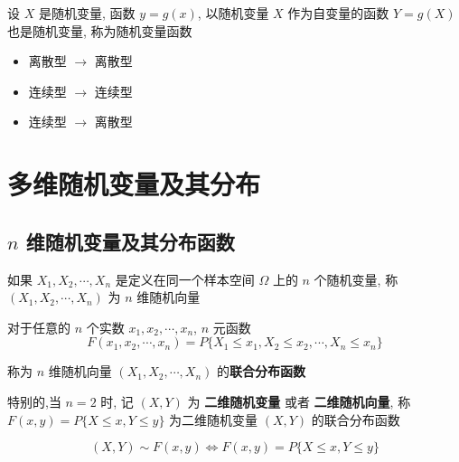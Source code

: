 \begin{definition}
	设 $X$ 是随机变量, 函数 $y = g(x)$, 以随机变量 $X$ 作为自变量的函数 $Y = g(X)$ 也是随机变量, 称为随机变量函数
	\begin{itemize}
		\item 离散型 $\to$ 离散型
		\item 连续型 $\to$ 连续型
		\item 连续型 $\to$ 离散型
	\end{itemize}
\end{definition}


\chapter{多维随机变量及其分布}

\section{$n$ 维随机变量及其分布函数}

\begin{definition}[$n$维随机变量]
	如果 $X_{1}, X_{2}, \cdots, X_{n}$ 是定义在同一个样本空间 $\Omega$ 上的 $n$ 个随机变量, 称 $(X_{1}, X_{2}, \cdots, X_{n})$ 为 $n$ 维随机向量
\end{definition}

\begin{definition}[$n$维随机变量分布函数]

	对于任意的 $n$ 个实数 $x_{1}, x_{2}, \cdots, x_{n}$, $n$ 元函数
	$$F(x_{1}, x_{2}, \cdots, x_{n}) = P\{X_{1}\leq x_{1},X_{2}\leq x_{2},\cdots,X_{n}\leq x_{n}\}$$
	
	称为 $n$ 维随机向量 $(X_{1},X_{2},\cdots,X_{n})$ 的\textbf{联合分布函数}
	
	特别的,当 $n = 2$ 时, 记 $(X,Y)$ 为 \textbf{二维随机变量} 或者 \textbf{二维随机向量}, 称 $F(x,y) = P\{X\leq x,Y\leq y\}$ 为二维随机变量 $(X,Y)$ 的联合分布函数 
	
	$$(X,Y)\sim F(x,y)\Leftrightarrow F(x,y)=P\{X\leq x,Y\leq y\}$$
\end{definition}

